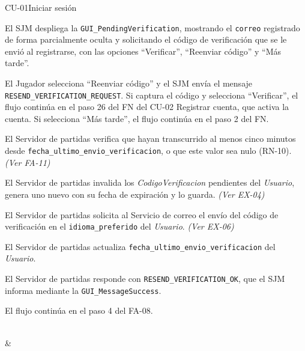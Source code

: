 \begin{fichacu}{CU-01}{Iniciar sesión}
{\begin{cuenum}[start=1]
      \item El SJM despliega la \texttt{GUI\_\allowbreak{}PendingVerification}, mostrando el \texttt{correo} registrado de forma parcialmente oculta y solicitando el código de verificación que se le envió al registrarse, con las opciones ``Verificar'', ``Reenviar código'' y ``Más tarde''.
      \item El Jugador selecciona ``Reenviar código'' y el SJM envía el mensaje \texttt{RESEND\_\allowbreak{}VERIFICATION\_\allowbreak{}REQUEST}. Si captura el código y selecciona ``Verificar'', el flujo continúa en el paso 26 del FN del \mbox{CU-02} Registrar cuenta, que activa la cuenta. Si selecciona ``Más tarde'', el flujo continúa en el paso 2 del FN.
      \item El Servidor de partidas verifica que hayan transcurrido al menos cinco minutos desde \texttt{fecha\_\allowbreak{}ultimo\_\allowbreak{}envio\_\allowbreak{}verificacion}, o que este valor sea nulo (\mbox{RN-10}). \textit{(Ver \mbox{FA-11})}
      \item El Servidor de partidas invalida los \textit{CodigoVerificacion} pendientes del \textit{Usuario}, genera uno nuevo con su fecha de expiración y lo guarda. \textit{(Ver \mbox{EX-04})}
      \item El Servidor de partidas solicita al Servicio de correo el envío del código de verificación en el \texttt{idioma\_\allowbreak{}preferido} del \textit{Usuario}. \textit{(Ver \mbox{EX-06})}
      \item El Servidor de partidas actualiza \texttt{fecha\_\allowbreak{}ultimo\_\allowbreak{}envio\_\allowbreak{}verificacion} del \textit{Usuario}.
      \item El Servidor de partidas responde con \texttt{RESEND\_\allowbreak{}VERIFICATION\_\allowbreak{}OK}, que el SJM informa mediante la \texttt{GUI\_\allowbreak{}MessageSuccess}.
      \item El flujo continúa en el paso 4 del \mbox{FA-08}.
    \end{cuenum}} \\
   & 
\end{fichacu}
